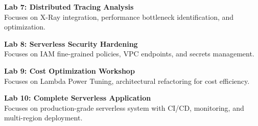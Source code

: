 \vspace{0.2cm}

\noindent\textbf{Lab 7: Distributed Tracing Analysis} \\
Focuses on X-Ray integration, performance bottleneck identification, and optimization.

\vspace{0.2cm}

\noindent\textbf{Lab 8: Serverless Security Hardening} \\
Focuses on IAM fine-grained policies, VPC endpoints, and secrets management.

\vspace{0.2cm}

\noindent\textbf{Lab 9: Cost Optimization Workshop} \\
Focuses on Lambda Power Tuning, architectural refactoring for cost efficiency.

\vspace{0.2cm}

\noindent\textbf{Lab 10: Complete Serverless Application} \\
Focuses on production-grade serverless system with CI/CD, monitoring, and multi-region deployment.

\vspace{0.2cm}

\newpage
{}
